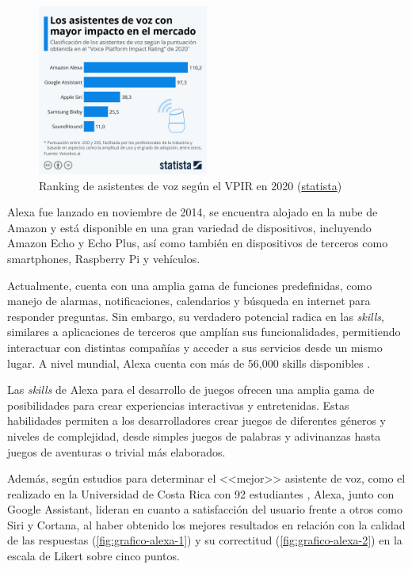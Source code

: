 \begin{figure}[H]
    \centering
    \includegraphics[width=0.5\textwidth]{imgs/grafico-asistentes.jpeg}
    \caption{Ranking de asistentes de voz según el VPIR en 2020 (\href{https://es.statista.com/grafico/22578/clasificacion-de-los-asistentes-de-voz/}{statista})}
    \label{fig:grafico-asistentes}
\end{figure}

Alexa fue lanzado en noviembre de 2014, se encuentra alojado en la nube de Amazon y está disponible en una gran variedad de dispositivos, incluyendo Amazon Echo y Echo Plus, así como también en dispositivos de terceros como smartphones, Raspberry Pi y vehículos.

Actualmente, cuenta con una amplia gama de funciones predefinidas, como manejo de alarmas, notificaciones, calendarios y búsqueda en internet para responder preguntas. Sin embargo, su verdadero potencial radica en las \textit{skills}, similares a aplicaciones de terceros que amplían sus funcionalidades, permitiendo interactuar con distintas compañías y acceder a sus servicios desde un mismo lugar. A nivel mundial, Alexa cuenta con más de 56,000 skills disponibles \parencite{tfgAlexa2}.

Las \textit{skills} de Alexa para el desarrollo de juegos ofrecen una amplia gama de posibilidades para crear experiencias interactivas y entretenidas. Estas habilidades permiten a los desarrolladores crear juegos de diferentes géneros y niveles de complejidad, desde simples juegos de palabras y adivinanzas hasta juegos de aventuras o trivial más elaborados.

Además, según estudios para determinar el <<mejor>> asistente de voz, como el realizado en la Universidad de Costa Rica con 92 estudiantes \parencite{berdasco2020evaluacion}, Alexa, junto con Google Assistant, lideran en cuanto a satisfacción del usuario frente a otros como Siri y Cortana, al haber obtenido los mejores resultados en relación con la calidad de las respuestas (\autoref{fig:grafico-alexa-1}) y su correctitud (\autoref{fig:grafico-alexa-2}) en la escala de Likert sobre cinco puntos.

